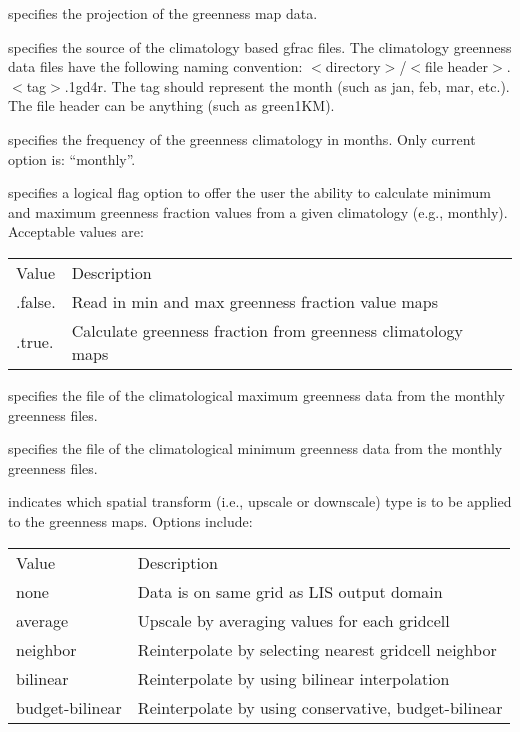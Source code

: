  specifies the projection of the
 greenness map data.

  specifies the source of the
 climatology based gfrac files.  The climatology greenness data
 files have the following naming convention:
 $<$directory$>$/$<$file header$>$.$<$tag$>$.1gd4r.
 The tag should represent the month (such as jan, feb, mar, etc.).
 The file header can be anything (such as green1KM).

  specifies the frequency of
 the greenness climatology in months.
 Only current option is: ``monthly''.

  specifies a
 logical flag option to offer the user the ability to calculate
 minimum and maximum greenness fraction values from a given
 climatology (e.g., monthly).
 Acceptable values are:

 \begin{tabular}{ll}
 Value     & Description                 \\
 .false.   & Read in min and max greenness fraction value maps     \\
 .true.    & Calculate greenness fraction from greenness climatology maps \\
 \end{tabular}

  specifies the file of the
 climatological maximum greenness data from the monthly
 greenness files.

  specifies the file of the
 climatological minimum greenness data from the monthly
 greenness files.

  indicates which spatial transform
 (i.e., upscale or downscale) type is to be applied to the greenness
 maps.  Options include:

 \begin{tabular}{ll}
 Value     & Description                                           \\
 none       & Data is on same grid as LIS output domain            \\
 average    & Upscale by averaging values for each gridcell        \\
 neighbor   & Reinterpolate by selecting nearest gridcell neighbor \\
 bilinear   & Reinterpolate by using bilinear interpolation        \\
 budget-bilinear & Reinterpolate by using conservative, budget-bilinear \\
 \end{tabular}
 

